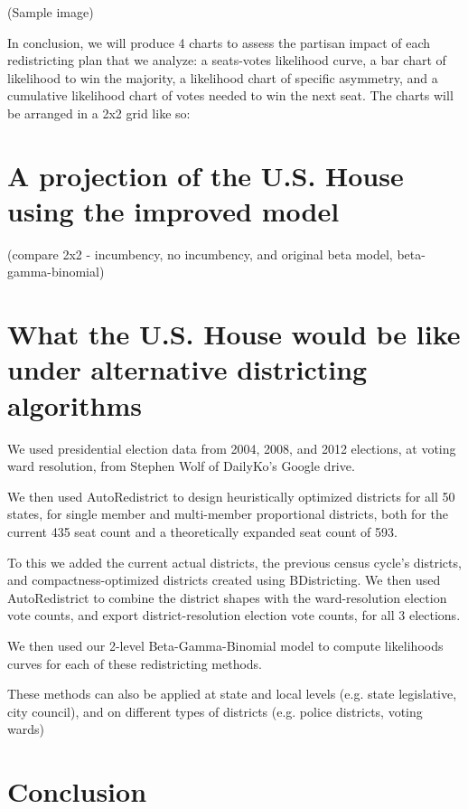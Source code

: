 \documentclass[preprint,12pt]{article}
\begin{document}
(Sample image)

In conclusion, we will produce 4 charts to assess the partisan impact of each redistricting plan that we analyze: a seats-votes likelihood curve, a bar chart of likelihood to win the majority, a likelihood chart of specific asymmetry, and a cumulative likelihood chart of votes needed to win the next seat.  The charts will be arranged in a 2x2 grid like so:


\section{A projection of the U.S. House using the improved model}
(compare 2x2 - incumbency, no incumbency, and original beta model, beta-gamma-binomial)

\section{What the U.S. House would be like under alternative districting algorithms}

We used presidential election data from 2004, 2008, and 2012 elections, at voting ward resolution, from Stephen Wolf of DailyKo's Google drive.

We then used AutoRedistrict to design heuristically optimized districts for all 50 states, for single member and multi-member proportional districts, both for the current 435 seat count and a theoretically expanded seat count of 593.

To this we added the current actual districts, the previous census cycle's districts, and compactness-optimized districts created using BDistricting.   We then used AutoRedistrict to combine the district shapes with the ward-resolution election vote counts, and export district-resolution election vote counts, for all 3 elections.

We then used our 2-level Beta-Gamma-Binomial model to compute likelihoods curves for each of these redistricting methods. 

These methods can also be applied at state and local levels (e.g. state legislative, city council), and on different types of districts (e.g. police districts, voting wards)

\section{Conclusion}

\clearpage


\clearpage
\end{document}
